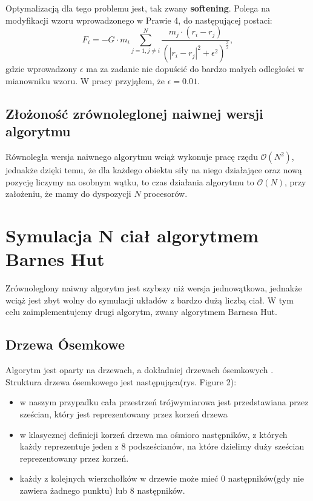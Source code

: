 \documentclass[14pt,twoside,a4paper]{article}
\theoremstyle{definition}
\begin{document}
Optymalizacją dla tego problemu jest, tak zwany \textbf{softening}\cite[str.~21]{Aarseth}. Polega na modyfikacji wzoru wprowadzonego w Prawie 4, do następującej postaci:
$$F_i = -G\cdot m_i \sum_{j=1, j\neq i}^N \frac{m_j\cdot (r_i - r_j)}{(|r_i - r_j|^2 + \epsilon^{2})^{\frac{3}{2}}},$$ 
gdzie wprowadzony $\epsilon$ ma za zadanie nie dopuścić do bardzo małych odległości w mianowniku wzoru. W pracy przyjąłem, że $\epsilon = 0.01$.

\subsection{\Large Złożoność zrównoleglonej naiwnej wersji algorytmu}
Równoległa wersja naiwnego algorytmu wciąż wykonuje pracę rzędu $\mathcal{O}(N^{2})$, jednakże dzięki temu, że dla każdego obiektu siły na niego działające oraz nową pozycję liczymy na osobnym wątku, to czas działania algorytmu to $\mathcal{O}(N)$, przy założeniu, że mamy do dyspozycji $N$ procesorów.

\section{\LARGE Symulacja N ciał algorytmem Barnes Hut}
Zrównoleglony naiwny algorytm jest szybszy niż wersja jednowątkowa, jednakże wciąż jest zbyt wolny do symulacji układów z bardzo dużą liczbą ciał. W tym celu zaimplementujemy drugi algorytm, zwany algorytmem Barnesa Hut. \cite[str.~446-449]{barnhut}

\subsection{\Large Drzewa Ósemkowe}
Algorytm jest oparty na drzewach, a dokładniej drzewach ósemkowych \cite{octree}.
Struktura drzewa ósemkowego jest następująca(rys. Figure 2):
\begin{itemize}
  \item w naszym przypadku cała przestrzeń trójwymiarowa jest przedstawiana przez sześcian, który jest reprezentowany przez korzeń drzewa
  \item w klasycznej definicji korzeń drzewa ma ośmioro następników, z których każdy reprezentuje jeden z 8 podsześcianów, na które dzielimy duży sześcian reprezentowany przez korzeń.
  \item każdy z kolejnych wierzchołków w drzewie może mieć 0 następników(gdy nie zawiera żadnego punktu) lub 8 następników.
\end{itemize}
\end{document}

